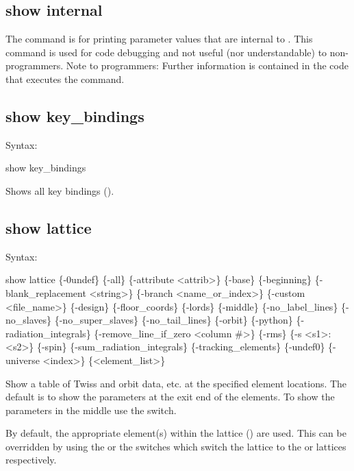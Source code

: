 {{{{{{{{\subsection{show internal}
\label{s:show.internal}

The  command is for printing parameter values that are internal to \tao. This
command is used for code debugging and not useful (nor understandable) to non-programmers. Note to
programmers: Further information is contained in the code that executes the 
command.


\subsection{show key_bindings}
\label{s:show.key}

Syntax:
\begin{example}
  show key_bindings
\end{example}

Shows all key bindings ().


\subsection{show lattice}
\label{s:show.lattice}

Syntax:
\begin{example}
  show lattice \{-0undef\} \{-all\} \{-attribute <attrib>\} \{-base\} \{-beginning\}
      \{-blank_replacement <string>\}  \{-branch <name_or_index>\}
      \{-custom <file_name>\} \{-design\} \{-floor_coords\} \{-lords\} \{-middle\}
      \{-no_label_lines\} \{-no_slaves\} \{-no_super_slaves\} \{-no_tail_lines\} \{-orbit\} 
      \{-python\} \{-radiation_integrals\} \{-remove_line_if_zero <column \#>\} 
      \{-rms\} \{-s <s1>:<s2>\} \{-spin\} \{-sum_radiation_integrals\} \{-tracking_elements\} 
      \{-undef0\} \{-universe <index>\} \{<element_list>\} 
\end{example}

Show a table of Twiss and orbit data, etc. at the specified element locations. The default is to
show the parameters at the exit end of the elements. To show the parameters in the middle use the
 switch.

By default, the appropriate element(s) within the  lattice () are
used. This can be overridden by using the  or the  switches which switch the
lattice to the  or  lattices respectively.

}}}}}}}}
